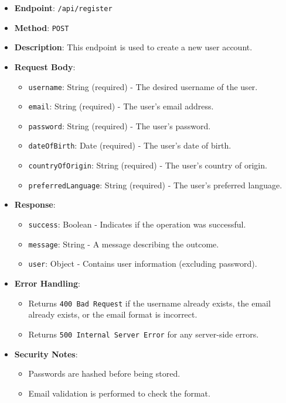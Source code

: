 \begin{itemize}
\tightlist
\item
  \textbf{Endpoint}: \texttt{/api/register}
\item
  \textbf{Method}: \texttt{POST}
\item
  \textbf{Description}: This endpoint is used to create a new user
  account.
\item
  \textbf{Request Body}:

  \begin{itemize}
  \tightlist
  \item
    \texttt{username}: String (required) - The desired username of the
    user.
  \item
    \texttt{email}: String (required) - The user's email address.
  \item
    \texttt{password}: String (required) - The user's password.
  \item
    \texttt{dateOfBirth}: Date (required) - The user's date of birth.
  \item
    \texttt{countryOfOrigin}: String (required) - The user's country of
    origin.
  \item
    \texttt{preferredLanguage}: String (required) - The user's preferred
    language.
  \end{itemize}
\item
  \textbf{Response}:

  \begin{itemize}
  \tightlist
  \item
    \texttt{success}: Boolean - Indicates if the operation was
    successful.
  \item
    \texttt{message}: String - A message describing the outcome.
  \item
    \texttt{user}: Object - Contains user information (excluding
    password).
  \end{itemize}
\item
  \textbf{Error Handling}:

  \begin{itemize}
  \tightlist
  \item
    Returns \texttt{400\ Bad\ Request} if the username already exists,
    the email already exists, or the email format is incorrect.
  \item
    Returns \texttt{500\ Internal\ Server\ Error} for any server-side
    errors.
  \end{itemize}
\item
  \textbf{Security Notes}:

  \begin{itemize}
  \tightlist
  \item
    Passwords are hashed before being stored.
  \item
    Email validation is performed to check the format.
  \end{itemize}
\end{itemize}

